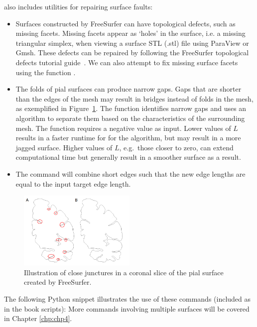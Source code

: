 \svmtk{} also includes utilities for repairing surface faults:
\begin{itemize}
\item
  Surfaces constructed by FreeSurfer can have topological defects,
  such as missing facets.  Missing facets appear as `holes' in the surface, 
  i.e. a missing triangular simplex, when viewing a surface STL (.stl) file 
  using ParaView or Gmsh.  %
  These defects can be repaired by following the
  FreeSurfer topological defects tutorial guide~\cite{freesurfer-wiki}.
  We can also attempt to fix missing surface facets using the \svmtk{}
  function .
\item
  The folds of pial surfaces can produce narrow gaps. Gaps that are
  shorter than the edges of the mesh may result in bridges instead
  of folds in the mesh, as exemplified in
  Figure~\ref{fig:chp3:juncture}. The function
  identifies narrow gaps and uses an algorithm to separate them based on 
  the characteristics of the surrounding mesh.  The function requires a 
  negative value as input.  Lower values of $L$ results in a faster runtime for 
  for the algorithm, but may result in a more jagged surface.   
  Higher values of $L$, e.g.~those closer to zero, can extend computational 
  time but generally result in a smoother surface as a result.%
\item 
  The command  will combine short edges
  such that the new edge lengths are equal to the input target edge
  length.
\end{itemize}
\begin{figure}\sidecaption
  \includegraphics[width=0.5\textwidth]{./graphics/chp3/juncturers-gap.png}
  \caption{Illustration of close junctures in a coronal
    slice of the pial surface created by FreeSurfer.}
  \label{fig:chp3:juncture}
\end{figure}
%
%
The following Python snippet illustrates the use of these commands
(included as  in the
book scripts):
More commands involving multiple surfaces will be
covered in Chapter \ref{chp:chp4}.

